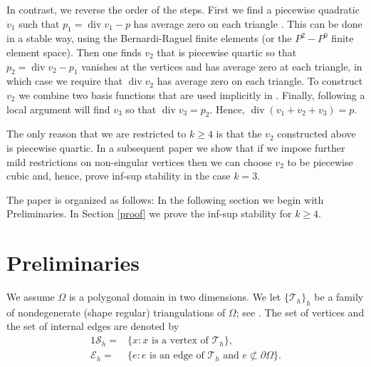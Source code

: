 \documentclass[11pt]{amsart}
\numberwithin{equation}{section}
\newcommand{\Eh}{\mathcal{E}_h}
\newcommand{\Sh}{\mathcal{S}_h}
\newcommand{\dive}{\operatorname{div}}
\newcommand{\Th}{\mathcal{T}_h}
\theoremstyle{definition}
\begin{document}
In contrast, we reverse the order of the steps. 
First we find a piecewise quadratic $v_1$ such that $p_1=\dive v_1-p$ 
 has average zero on each triangle . This can be done in a stable way, 
using the Bernardi-Raguel finite elements \cite{bernardi1985analysis} (or the $P^2-P^0$ finite element space).  
Then one  finds $v_2$ that is piecewise quartic so that $p_2=\dive v_2-p_1$ vanishes at the vertices and has average zero at each triangle, in which case we require that $\dive v_2$ has average zero on each triangle.  To construct $v_2$   we combine two basis functions that are used implicitly in \cite{scott1985norm}. Finally, following \cite{vogelius1983right} a local argument will find $v_3$ so that $\dive v_3=p_2$.  Hence, $\dive(v_1+v_2+v_3)=p$.  


The only reason that we are restricted to $k \ge 4$ is that the $v_2$ constructed above is piecewise quartic. 
In a subsequent paper we show that if we impose further mild restrictions on non-singular vertices then we can choose $v_2$ to be piecewise cubic and, hence, prove inf-sup stability in the case $k=3$.




The paper is organized as follows: In the following section we begin with Preliminaries. 
In Section \ref{proof} we prove the inf-sup stability for $k \ge 4$. 



\section{Preliminaries}\label{preliminaries}

We assume $\Omega$ is a polygonal domain in  two dimensions. We let $\{ \mathcal{T}_h\}_h$ be a family of nondegenerate (shape regular) triangulations of $\Omega$; see \cite{brenner2007mathematical} .   The set of vertices and the set of internal edges are denoted by
\begin{alignat*}{1}
\Sh=&\{ x:  x  \text{ is a vertex of } \Th \}, \\
\Eh=&\{ e: e \text{ is an edge of }  \Th \text{ and } e \not\subset \partial \Omega \}.\\ 
 \end{alignat*}
\end{document}
